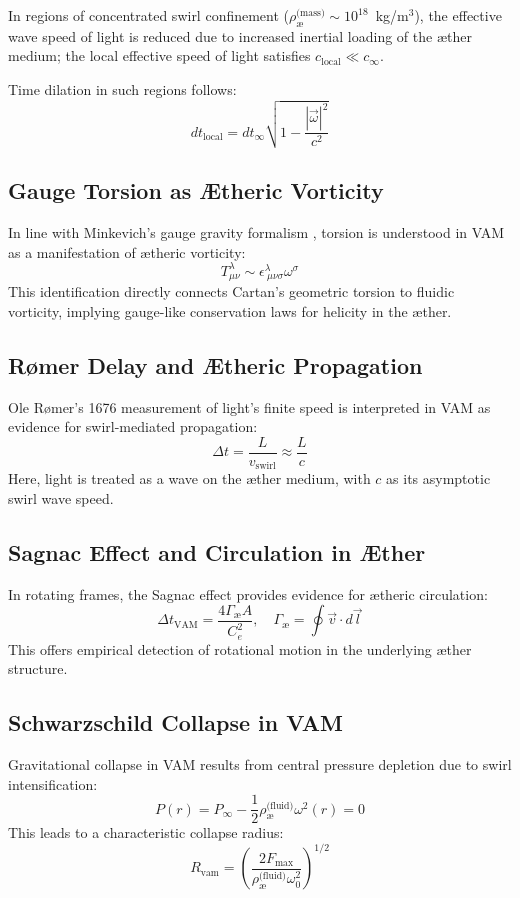 \documentclass[12pt]{article}
\begin{document}
            In regions of concentrated swirl confinement ($\rho_{\text{\ae}}^{\text{(mass)}} \sim 10^{18}$~kg/m$^3$), the effective wave speed of light is reduced due to increased inertial loading of the æther medium; the local effective speed of light satisfies $c_\text{local} \ll c_\infty$.

            Time dilation in such regions follows:
            \[
                dt_\text{local} = dt_\infty \sqrt{1 - \frac{|\vec{\omega}|^2}{c^2}}
            \]

            \subsection*{Gauge Torsion as Ætheric Vorticity}
            In line with Minkevich’s gauge gravity formalism \cite{minkevich2008gauge}, torsion is understood in VAM as a manifestation of ætheric vorticity:
            \[
                T^\lambda_{\mu\nu} \sim \epsilon^{\lambda}_{\ \mu\nu\sigma} \omega^\sigma
            \]
            This identification directly connects Cartan's geometric torsion to fluidic vorticity, implying gauge-like conservation laws for helicity in the æther.

            \subsection*{Rømer Delay and Ætheric Propagation}
            Ole Rømer’s 1676 measurement of light’s finite speed \cite{roemer1676light} is interpreted in VAM as evidence for swirl-mediated propagation:
            \[
                \Delta t = \frac{L}{v_\text{swirl}} \approx \frac{L}{c}
            \]
            Here, light is treated as a wave on the æther medium, with $c$ as its asymptotic swirl wave speed.

            \subsection*{Sagnac Effect and Circulation in Æther}
            In rotating frames, the Sagnac effect provides evidence for ætheric circulation:
            \[
                \Delta t_\text{VAM} = \frac{4 \Gamma_{\text{\ae}} A}{C_e^2}, \quad \Gamma_{\text{\ae}} = \oint \vec{v} \cdot d\vec{l}
            \]
            This offers empirical detection of rotational motion in the underlying æther structure.

            \subsection*{Schwarzschild Collapse in VAM}
            Gravitational collapse in VAM results from central pressure depletion due to swirl intensification:
            \[
                P(r) = P_\infty - \frac{1}{2} \rho_{\text{\ae}}^{\text{(fluid)}} \omega^2(r) = 0
            \]
            This leads to a characteristic collapse radius:
            \[
                R_\text{vam} = \left( \frac{2 F_{\text{max}}}{\rho_{\text{\ae}}^{\text{(fluid)}} \omega_0^2} \right)^{1/2}
            \]
\end{document}
